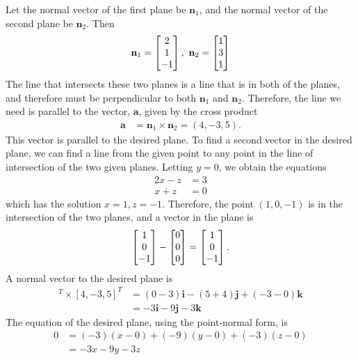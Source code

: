 \documentclass{article}
\begin{document}
\begin{enumerate}
Let the normal vector of the first plane be $\mathbf{n}_1$, and the normal vector of the second plane be $\mathbf{n}_2$. Then  
\begin{align*}
\mathbf{n}_1 =\BM 2 \\ 1 \\ -1 \EM, \ 
\mathbf{n}_2=\BM 1\\ 3 \\ 1 \EM
\end{align*}
The line that intersects these two planes is a line that is in both of the planes, and therefore must be perpendicular to both $\mathbf{n}_1$ and $\mathbf{n}_2$. Therefore, the line we need is parallel to the vector, $\mathbf{a}$, given by the cross product
\begin{align*}
\mathbf{a} &= \mathbf{n}_1 \times \mathbf{n}_2 = (4,-3,5).
\end{align*}
This vector is parallel to the desired plane. To find a second vector in the desired plane, we can find a line from the given point to any point in the line of intersection of the two given planes. Letting $y=0$, we obtain the equations
\begin{align*}
2x-z&=3\\
x+z&=0
\end{align*}
which has the solution $x=1, z=-1$. Therefore, the point $(1,0,-1)$ is in the intersection of the two planes, and a vector in the plane is
\begin{align*}
\begin{bmatrix} 1 \\ 0 \\ -1 \end{bmatrix}- \begin{bmatrix} 0 \\ 0 \\ 0 \end{bmatrix} = \begin{bmatrix} 1 \\ 0 \\ -1 \end{bmatrix}.
\end{align*}
A normal vector to the desired plane is 
\begin{align*}
[1,0,-1]^T \times [4,-3,5]^T 
&= (0-3)\mathbf{i} - (5+4)\mathbf{j}+(-3-0)\mathbf{k} \\
&=-3\mathbf{i} -9 \mathbf{j} -3\mathbf{k} 
\end{align*}
The equation of the desired plane, using the point-normal form, is
\begin{align*}
0&=(-3)(x-0)+(-9)(y-0)+(-3)(z-0)\\
&=-3x-9y-3z
\end{align*}


\end{enumerate}
\end{document}
